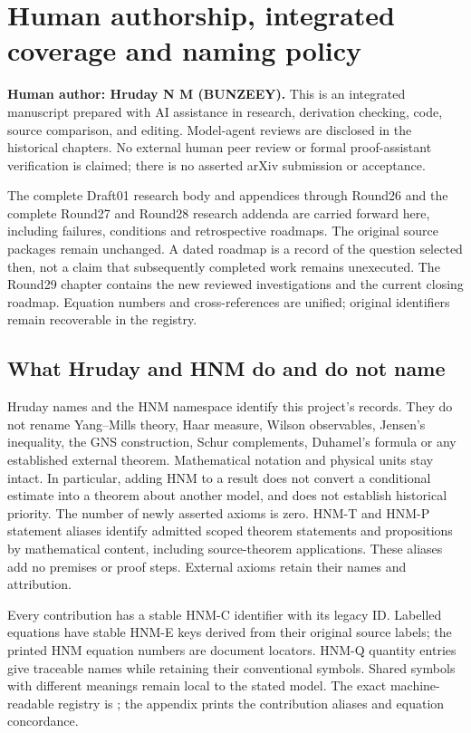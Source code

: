 \section{Human authorship, integrated coverage and naming policy}
\label{sec:editorial-front}
\textbf{Human author: Hruday N M (BUNZEEY).} This is an integrated manuscript prepared with AI assistance in research, derivation checking, code, source comparison, and editing. Model-agent reviews are disclosed in the historical chapters. No external human peer review or formal proof-assistant verification is claimed; there is no asserted arXiv submission or acceptance.

The complete Draft01 research body and appendices through Round26 and the complete Round27 and Round28 research addenda are carried forward here, including failures, conditions and retrospective roadmaps. The original source packages remain unchanged. A dated roadmap is a record of the question selected then, not a claim that subsequently completed work remains unexecuted. The Round29 chapter contains the new reviewed investigations and the current closing roadmap. Equation numbers and cross-references are unified; original identifiers remain recoverable in the registry.

\subsection{What Hruday and HNM do and do not name}
Hruday names and the HNM namespace identify this project's records. They do not rename Yang--Mills theory, Haar measure, Wilson observables, Jensen's inequality, the GNS construction, Schur complements, Duhamel's formula or any established external theorem. Mathematical notation and physical units stay intact. In particular, adding HNM to a result does not convert a conditional estimate into a theorem about another model, and does not establish historical priority. The number of newly asserted axioms is zero. HNM-T and HNM-P statement aliases identify admitted scoped theorem statements and propositions by mathematical content, including source-theorem applications. These aliases add no premises or proof steps. External axioms retain their names and attribution.

Every contribution has a stable HNM-C identifier with its legacy ID. Labelled equations have stable HNM-E keys derived from their original source labels; the printed HNM equation numbers are document locators. HNM-Q quantity entries give traceable names while retaining their conventional symbols. Shared symbols with different meanings remain local to the stated model. The exact machine-readable registry is ; the appendix prints the contribution aliases and equation concordance.


